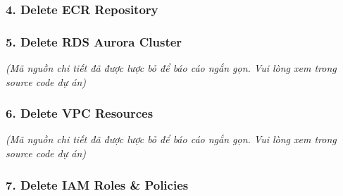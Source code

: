 \hypertarget{delete-ecr-repository}{%
\subsubsection{4. Delete ECR Repository}}

\begin{Shaded}
\begin{Highlighting}[]
\DataTypeTok{\textbackslash{}}
  \DataTypeTok{\textbackslash{}}
   \VariableTok{$(}  \VariableTok{)} \DataTypeTok{\textbackslash{}}

 
\end{Highlighting}
\end{Shaded}

\hypertarget{delete-rds-aurora-cluster}{%
\subsubsection{5. Delete RDS Aurora
Cluster}}

\emph{(Mã nguồn chi tiết đã được lược bỏ để báo cáo ngắn gọn. Vui lòng
xem trong source code dự án)}

\hypertarget{delete-vpc-resources}{%
\subsubsection{6. Delete VPC Resources}}

\emph{(Mã nguồn chi tiết đã được lược bỏ để báo cáo ngắn gọn. Vui lòng
xem trong source code dự án)}

\hypertarget{delete-iam-roles-policies}{%
\subsubsection{7. Delete IAM Roles \&
Policies}}

